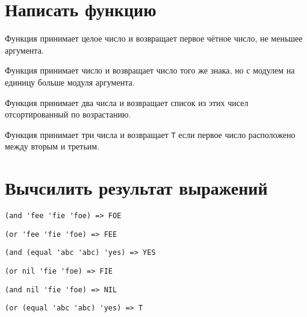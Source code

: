 
\section{Написать функцию}

\problem Функция принимает целое число и возвращает первое чётное число, не меньшее аргумента.



\problem Функция принимает число и возвращает число того же знака, но с модулем на единицу больше модуля аргумента.



\problem Функция принимает два числа и возвращает список из этих чисел отсортированный по возрастанию.



\problem Функция принимает три числа и возвращает \verb|T| если первое число расположено между вторым и третьим.




\section{Вычсилить результат выражений}

\problem \hfill
\begin{lstlisting}
(and 'fee 'fie 'foe) => FOE
\end{lstlisting}


\problem \hfill
\begin{lstlisting}
(or 'fee 'fie 'foe) => FEE
\end{lstlisting}


\problem \hfill
\begin{lstlisting}
(and (equal 'abc 'abc) 'yes) => YES
\end{lstlisting}


\problem \hfill
\begin{lstlisting}
(or nil 'fie 'foe) => FIE
\end{lstlisting}


\problem \hfill
\begin{lstlisting}
(and nil 'fie 'foe) => NIL
\end{lstlisting}


\problem \hfill
\begin{lstlisting}
(or (equal 'abc 'abc) 'yes) => T
\end{lstlisting}



